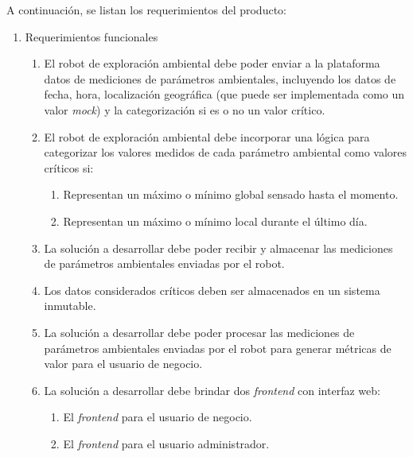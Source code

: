 A continuación, se listan los requerimientos del producto:

\begin{enumerate}	
	\item Requerimientos funcionales		
	\begin{enumerate}	
		
		\item El robot de exploración ambiental debe poder enviar a la plataforma datos de mediciones de parámetros ambientales, incluyendo los datos de fecha, hora, localización geográfica (que puede ser implementada como un valor \textit{mock}) y la categorización si es o no un valor crítico.
		\item El robot de exploración ambiental debe incorporar una lógica para categorizar los valores medidos de cada parámetro ambiental como valores críticos si:
		\begin{enumerate}				
			\item Representan un máximo o mínimo global sensado hasta el momento.				
			\item Representan un máximo o mínimo local durante el último día.				
		\end{enumerate}			
		\item La solución a desarrollar debe poder recibir y almacenar las mediciones de parámetros ambientales enviadas por el robot.
		\item Los datos considerados críticos deben ser almacenados en un sistema inmutable.
		\item La solución a desarrollar debe poder procesar las mediciones de parámetros ambientales enviadas por el robot para generar métricas de valor para el usuario de negocio.		
		\item La solución a desarrollar debe brindar dos \textit{frontend} con interfaz web:
			\begin{enumerate}				
				\item El \textit{frontend} para el usuario de negocio.				
				\item El \textit{frontend} para el usuario administrador.				
			\end{enumerate}			
		

\end{enumerate}
\end{enumerate}
